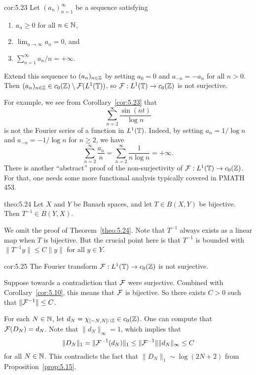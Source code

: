 \begin{cor}{cor:5.23}
    Let $(a_n)_{n=1}^\infty$ be a sequence satisfying 
    \begin{enumerate}[(1)]
        \item $a_n \geq 0$ for all $n \in \mathbb{N}$, 
        \item $\lim_{n\to\infty} a_n = 0$, and 
        \item $\sum_{n=1}^\infty a_n/n = +\infty$. 
    \end{enumerate}
    Extend this sequence to $(a_n)_{n\in\mathbb{Z}}$ by setting 
    $a_0 = 0$ and $a_{-n} = -a_n$ for all $n > 0$. Then 
    $(a_n)_{n\in\mathbb{Z}} \in c_0(\mathbb{Z}) \setminus {\cal F}(L^1(\mathbb{T}))$, so 
    ${\cal F} : L^1(\mathbb{T}) \to c_0(\mathbb{Z})$ is not surjective. 
\end{cor}

For example, we see from Corollary~\ref{cor:5.23} that 
\[ \sum_{n=2}^\infty \frac{\sin(nt)}{\log n} \] 
is not the Fourier series of a function in $L^1(\mathbb{T})$. Indeed, by setting 
$a_n = 1/\log n$ and $a_{-n} = -1/\log n$ for $n \geq 2$, we have 
\[ \sum_{n=2}^\infty \frac{a_n}{n} = \sum_{n=2}^\infty \frac{1}{n\log n} 
= +\infty. \] 
There is another ``abstract'' proof of the non-surjectivity of 
${\cal F} : L^1(\mathbb{T}) \to c_0(\mathbb{Z})$. For that, one needs some 
more functional analysis typically covered in PMATH 453. 

\begin{theo}{theo:5.24}
    Let $X$ and $Y$ be Banach spaces, and let $T \in B(X, Y)$ be 
    bijective. Then $T^{-1} \in B(Y, X)$.
\end{theo}

We omit the proof of Theorem~\ref{theo:5.24}. Note that $T^{-1}$ always 
exists as a linear map when $T$ is bijective. But the crucial point here is 
that $T^{-1}$ is bounded with $\|T^{-1}y\| \leq C\|y\|$ for all $y \in Y$. 

\begin{cor}{cor:5.25}
    The Fourier transform ${\cal F} : L^1(\mathbb{T}) \to c_0(\mathbb{Z})$ is not surjective.
\end{cor}
\begin{pf}
    Suppose towards a contradiction that ${\cal F}$ were surjective. 
    Combined with Corollary~\ref{cor:5.10}, this means that 
    ${\cal F}$ is bijective. So there exists $C > 0$ such that 
    $\|{\cal F}^{-1}\| \leq C$.

    For each $N \in \mathbb{N}$, let $d_N = \chi_{[-N,N]\cap \mathbb{Z}} \in c_0(\mathbb{Z})$. 
    One can compute that ${\cal F}(D_N) = d_N$. Note that 
    $\|d_N\|_\infty = 1$, which implies that 
    \[ \|D_N\|_1 = \|{\cal F}^{-1}(d_N)\|_1 \leq 
    \|{\cal F}^{-1}\| \|d_N\|_\infty \leq C \] 
    for all $N \in \mathbb{N}$. This contradicts the fact that $\|D_N\|_1 
    \sim \log(2N+2)$ from Proposition~\ref{prop:5.15}.
\end{pf}